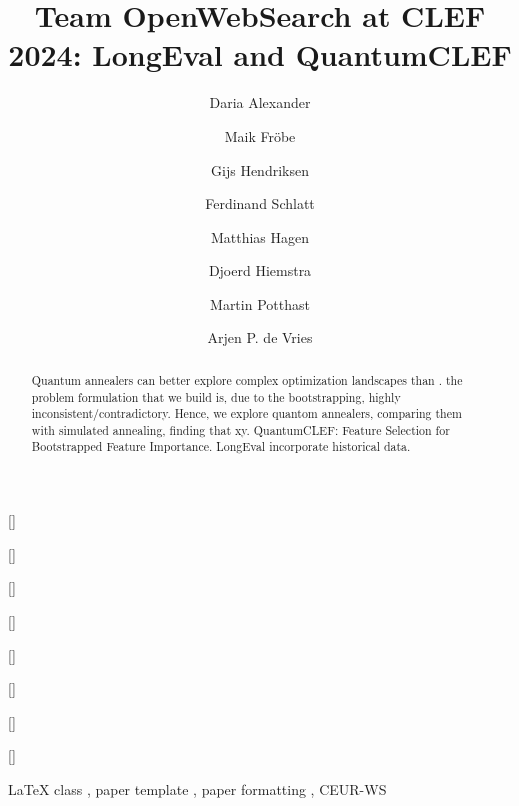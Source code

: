 


\title{Team OpenWebSearch at CLEF 2024: LongEval and QuantumCLEF}

\address[1]{Radboud Universiteit Nijmegen}
\address[2]{Friedrich-Schiller-Universit{\"a}t Jena}
\address[3]{University of Kassel, hessian.AI, ScaDS.AI}

\author[1]{Daria Alexander}[]
\author[2]{Maik Fr{\"o}be}[]
\author[1]{Gijs Hendriksen}[]
\author[2]{Ferdinand Schlatt}[]
\author[2]{Matthias Hagen}[]
\author[1]{Djoerd Hiemstra}[]
\author[3]{Martin Potthast}[]
\author[1]{Arjen P. de Vries}[]


\begin{abstract}
  Quantum annealers can better explore complex optimization landscapes than . the problem formulation that we build is, due to the bootstrapping, highly inconsistent/contradictory. Hence, we explore quantom annealers, comparing them with simulated annealing, finding that xy. QuantumCLEF: Feature Selection for Bootstrapped Feature Importance.
  LongEval incorporate historical data.
\end{abstract}

\begin{keywords}
  LaTeX class \sep
  paper template \sep
  paper formatting \sep
  CEUR-WS
\end{keywords}

\maketitle
